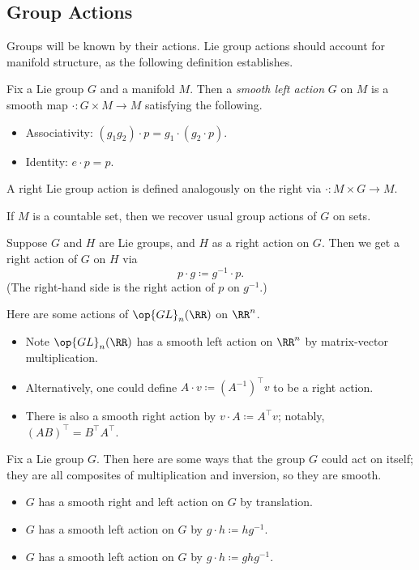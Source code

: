 \documentclass[../notes.tex]{subfiles}
\begin{document}
\subsection{Group Actions}
Groups will be known by their actions. Lie group actions should account for manifold structure, as the following definition establishes.
\begin{definition}
	Fix a Lie group $G$ and a manifold $M$. Then a \textit{smooth left action} $G$ on $M$ is a smooth map $\cdot\colon G\times M\to M$ satisfying the following.
	\begin{itemize}
		\item Associativity: $(g_1g_2)\cdot p=g_1\cdot(g_2\cdot p)$.
		\item Identity: $e\cdot p=p$.
	\end{itemize}
	A right Lie group action is defined analogously on the right via $\cdot\colon M\times G\to M$.
\end{definition}
\begin{example}
	If $M$ is a countable set, then we recover usual group actions of $G$ on sets.
\end{example}
\begin{example}
	Suppose $G$ and $H$ are Lie groups, and $H$ as a right action on $G$. Then we get a right action of $G$ on $H$ via
	\[p\cdot g\coloneqq g^{-1}\cdot p.\]
	(The right-hand side is the right action of $p$ on $g^{-1}$.)
\end{example}
\begin{example}
	Here are some actions of $\op{GL}_n(\RR)$ on $\RR^n$.
	\begin{itemize}
		\item Note $\op{GL}_n(\RR)$ has a smooth left action on $\RR^n$ by matrix-vector multiplication.
		\item Alternatively, one could define $A\cdot v\coloneqq\left(A^{-1}\right)^\intercal v$ to be a right action.
		\item There is also a smooth right action by $v\cdot A\coloneqq A^\intercal v$; notably, $(AB)^\intercal=B^\intercal A^\intercal$.
	\end{itemize}
\end{example}
\begin{example}
	Fix a Lie group $G$. Then here are some ways that the group $G$ could act on itself; they are all composites of multiplication and inversion, so they are smooth.
	\begin{itemize}
		\item $G$ has a smooth right and left action on $G$ by translation.
		\item $G$ has a smooth left action on $G$ by $g\cdot h\coloneqq hg^{-1}$.
		\item $G$ has a smooth left action on $G$ by $g\cdot h\coloneqq ghg^{-1}$.
	\end{itemize}
\end{example}
\end{document}
